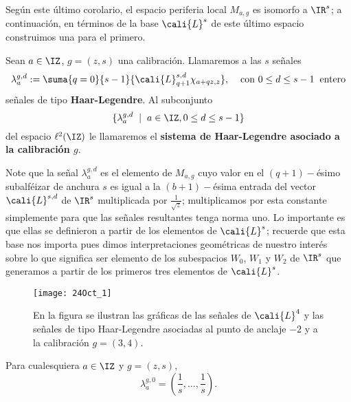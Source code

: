 Según este último corolario, el espacio
periferia local $M_{a,g}$ es isomorfo a $\IR^{s}$;
a continuación, en términos de la base $\cali{L}^{s}$
de este último espacio construimos una para el primero.


\begin{defi} \label{def: sistema de haar-legendre}
Sean $a \in \IZ$, $g=(z,s)$ una calibración.
Llamaremos a las $s$ señales
\[
\lambda_{a}^{g,d} := \suma{q=0}{s-1}{  \cali{L}^{s,d}_{q+1} 
\chi _{a+qz, z}}, \hspace{0.4cm} \text{con } 0 \leq d \leq s-1 
\hspace{0.2cm} \text{entero}
\]
señales de tipo \textbf{Haar-Legendre}. 
Al subconjunto
\[
\{ \lambda_{a}^{g,d} \hspace{0.2cm} | \hspace{0.2cm} a \in \IZ, 0 \leq d \leq s-1  \}
\]
del espacio $\ell^{2}(\IZ)$  le llamaremos
el \textbf{sistema de Haar-Legendre asociado a la
calibración $g$}.
\end{defi}

Note que la señal
$\lambda_{a}^{g,d}$ es el elemento de $M_{a,g}$
cuyo valor en el $(q+1)-$ésimo subalféizar
de anchura $s$
es igual a la $(b+1)-$ésima entrada del 
vector $\cali{L}^{s,d}$ de $\IR^{s}$ multiplicada
por $\frac{1}{\sqrt{z}}$; multiplicamos por esta constante
simplemente para que las señales resultantes tenga norma uno.
Lo importante es que ellas se definieron a partir de 
los elementos de $\cali{L}^{s}$; recuerde que esta base
nos importa pues dimos 
interpretaciones geométricas de nuestro interés sobre
lo que significa ser elemento de los subespacios $W_{0}$,
$W_{1}$ y $W_{2}$
de $\IR^{s}$ que generamos
a partir de los primeros tres elementos de $\cali{L}^{s}$. 



\begin{figure}[H]
	\centering
	\texttt{[image: 24Oct\_1]}
	\caption{En la figura se ilustran las gráficas de las señales
	de $\cali{L}^{4}$ y las señales de tipo Haar-Legendre
	asociadas al punto de anclaje $-2$ y a la calibración
	$g=(3,4)$.}
\end{figure}

\begin{obs} \label{obs: senales de haar-legendre de grado cero son constantes}
Para cualesquiera $a \in \IZ$ 
y $g=(z,s)$,
\[
\lambda_{a}^{g,0}= \left( \frac{1}{s}, \ldots ,\frac{1}{s} \right).
\]
\end{obs}

